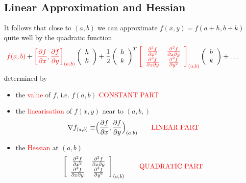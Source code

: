 \documentclass{article}
\begin{document}
\subsection{Linear Approximation and Hessian}

It follows that close to $(a,b)$ we can approximate $f(x,y)=f(a+h,b+k)$ quite well by the quadratic function
{\small
$$
\hspace{-.5cm}
\textcolor{red}{f(a,b)} + \textcolor{red}{\left[ \frac{\partial f}{\partial x}, 
\frac{\partial f}{\partial y} \right]_{(a,b)}} \left( \begin{array}{c} h\\k \end{array} \right) + \frac{1}{2} \left( \begin{array}{c} h\\k \end{array} \right)^T \textcolor{red}{\left[ \begin{array}{cc}
\frac{\partial ^2 f}{\partial x ^2} & \frac{\partial ^2 f}{\partial x \partial y}\\\frac{\partial ^2 f}{\partial x \partial y} & \frac{\partial ^2 f}{\partial y ^2} \end{array} \right]_{(a,b)} }\left( \begin{array}{c} h\\k \end{array} \right) + \ldots 
$$
}
determined by
\begin{itemize}
\item
the \textcolor{red}{value} of $f$, i.e. $f(a,b)$ \qquad \textcolor{red}{CONSTANT PART}
\item
the \textcolor{red}{linearisation} of $f(x,y)$ near to $(a,b,)$
$$
\nabla f_{(a,b)} \equiv \Bigr( \frac{\partial f} {\partial x},
\frac{\partial f} {\partial y} \Bigr)_{(a,b)} \qquad \mbox{\textcolor{red}{LINEAR PART}}
$$
\item
the \textcolor{red}{Hessian} at $(a,b)$
$$
\left[ \begin{array}{cc}
\frac{\partial ^2 f}{\partial x ^2} & \frac{\partial ^2 f}{\partial x \partial y}\\\frac{\partial ^2 f}{\partial x \partial y} & \frac{\partial ^2 f}{\partial y ^2} \end{array} \right]_{(a,b)} 
\qquad \mbox{\textcolor{red}{QUADRATIC PART}}
$$
\end{itemize}
\end{document}
